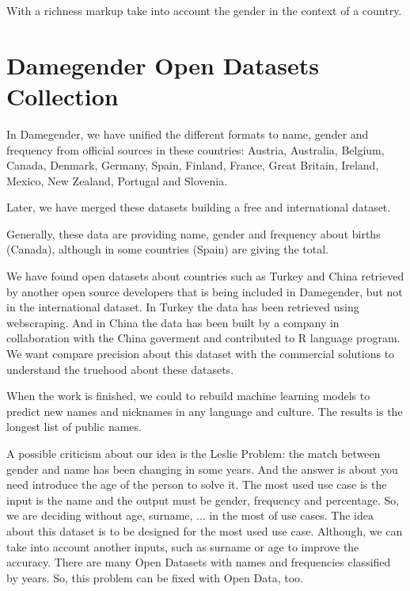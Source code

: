 \documentclass[a4paper]{article}
\begin{document}
With a richness markup take into account the gender in the context of
a country.

\section{Damegender Open Datasets Collection}
\label{sec:damegender}

In Damegender, we have unified the different formats to name, gender
and frequency from official sources in these countries: Austria,
Australia, Belgium, Canada, Denmark, Germany, Spain, Finland, France,
Great Britain, Ireland, Mexico, New Zealand, Portugal and Slovenia.

Later, we have merged these datasets building a free and international
dataset.

Generally, these data are providing name, gender and frequency about
births (Canada), although in some countries (Spain) are giving the
total.

We have found open datasets about countries such as Turkey and China
retrieved by another open source developers that is being included in
Damegender, but not in the international dataset. In Turkey the data
has been retrieved using webscraping. And in China the data has been
built by a company in collaboration with the China goverment and
contributed to R language program. We want compare precision about
this dataset with the commercial solutions to understand the truehood
about these datasets.

When the work is finished, we could to rebuild machine learning models
to predict new names and nicknames in any language and culture. The
results is the longest list of public names.


A possible criticism about our idea is the Leslie
Problem\cite{blevins2015jane}: the match between gender and name has
been changing in some years. And the answer is about you need
introduce the age of the person to solve it. The most used use case is
the input is the name and the output must be gender, frequency and
percentage. So, we are deciding without age, surname, ... in the most
of use cases. The idea about this dataset is to be designed for the
most used use case. Although, we can take into account another inputs,
such as surname or age to improve the accuracy. There are many Open
Datasets with names and frequencies classified by years. So, this
problem can be fixed with Open Data, too.
\end{document}

